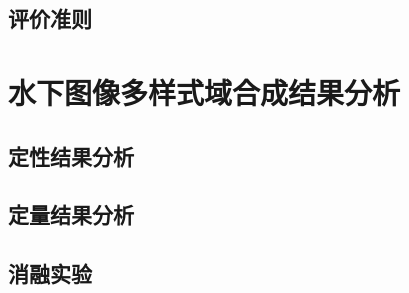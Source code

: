\subsection{评价准则}

\section{水下图像多样式域合成结果分析}
\subsection{定性结果分析}

\subsection{定量结果分析}


\subsection{消融实验}
